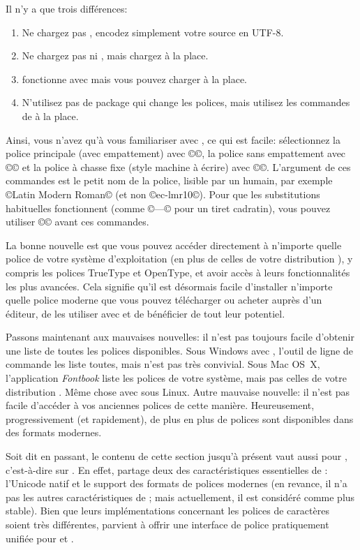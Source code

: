 \documentclass{lltxdoc}
\begin{document}
Il n'y a que trois différences:
\begin{enumerate}
  \item Ne chargez pas , encodez simplement votre source en UTF-8.
  \item Ne chargez pas  ni , mais chargez 
     à la place.
  \item {} fonctionne avec \lualatex mais vous pouvez charger 
     à la place.
  \item N'utilisez pas de package qui change les polices, mais utilisez les commandes
    de  à la place.
\end{enumerate}
Ainsi, vous n'avez qu'à vous familiariser avec , ce qui est facile:
sélectionnez la police principale (avec empattement) avec ©\setmainfont©,
la police sans empattement avec ©\setsansfont© et la police à chasse fixe
(style machine à écrire) avec ©\setmonofont©. L'argument de ces commandes est
le petit nom de la police, lisible par un humain, par exemple ©Latin Modern Roman©
(et non ©ec-lmr10©). Pour que les substitutions \tex habituelles fonctionnent
(comme ©---© pour un tiret cadratin), vous pouvez utiliser
©© avant ces commandes.

La bonne nouvelle est que vous pouvez accéder directement à n'importe quelle
police de votre système d'exploitation (en plus de celles de votre distribution \tex),
y compris les polices TrueType et OpenType, et avoir accès à leurs fonctionnalités
les plus avancées. Cela signifie qu'il est désormais facile d'installer n'importe
quelle police moderne que vous pouvez télécharger ou acheter auprès d'un éditeur,
de les utiliser avec \lualatex et de bénéficier de tout leur potentiel.

Passons maintenant aux mauvaises nouvelles: il n'est pas toujours facile d'obtenir
une liste de toutes les polices disponibles. Sous Windows avec \texlive, l'outil
de ligne de commande  les liste toutes, mais n'est pas très convivial.
Sous Mac OS~X, l'application \emph{Fontbook} liste les polices de votre système,
mais pas celles de votre distribution \tex. Même chose avec  sous Linux.
Autre mauvaise nouvelle: il n'est pas facile d'accéder à vos anciennes polices
de cette manière. Heureusement, progressivement (et rapidement), de plus en plus
de polices sont disponibles dans des formats modernes.

Soit dit en passant, le contenu de cette section jusqu'à présent vaut aussi pour
\xelatex, c'est-à-dire \latex sur \xetex. En effet, \xetex partage deux des
caractéristiques essentielles de \luatex: l'Unicode natif et le support des formats
de polices modernes (en revance, il n'a pas les autres caractéristiques de \luatex;
mais actuellement, il est considéré comme plus stable). Bien que leurs implémentations
concernant les polices de caractères soient très différentes,  parvient
à offrir une interface de police pratiquement unifiée pour \xelatex et \lualatex.
\end{document}
